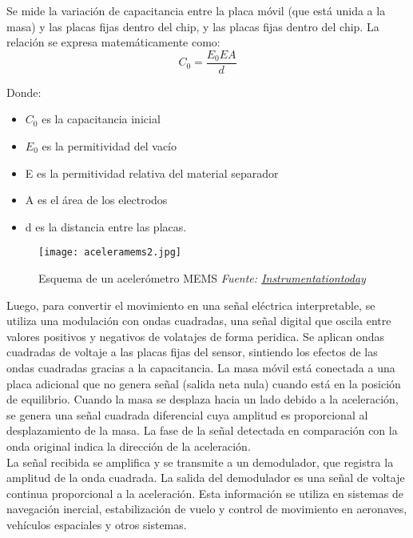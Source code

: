 Se mide la variación de capacitancia entre la placa móvil (que está unida a la masa) y las placas fijas dentro del chip, y las placas fijas dentro del chip. La relación se expresa matemáticamente como:
\begin{equation}
C_{0} = \frac{E_{0} E A}{d}
\end{equation}

Donde:
\begin{itemize}
\item \(C_{0}\) es la capacitancia inicial
\item \(E_{0}\) es la permitividad del vacío
\item E es la permitividad relativa del material separador
\item A es el área de los electrodos 
\item d es la distancia entre las placas.
\end{itemize}


\begin{figure}[H]
    \centering
    \texttt{[image: aceleramems2.jpg]}
    \caption{\centering Esquema de un acelerómetro MEMS\textit{ Fuente: \href{https://www.instrumentationtoday.com/basic-instrumentation/page/3/}{Instrumentationtoday}}}
    \label{fig:mems2}
\end{figure}

Luego, para convertir el movimiento en una señal eléctrica interpretable, se utiliza una modulación con ondas cuadradas, una señal digital que oscila entre valores positivos y negativos de volatajes de forma peridica. Se aplican ondas cuadradas de voltaje a las placas fijas del sensor, sintiendo los efectos de las ondas cuadradas gracias a la capacitancia. La masa móvil está conectada a una placa adicional que no genera señal (salida neta nula) cuando está en la posición de equilibrio. Cuando la masa se desplaza hacia un lado debido a la aceleración, se genera una señal cuadrada diferencial cuya amplitud es proporcional al desplazamiento de la masa. La fase de la señal detectada en comparación con la onda original indica la dirección de la aceleración.\\

La señal recibida se amplifica y se transmite a un demodulador, que registra la amplitud de la onda cuadrada. La salida del demodulador es una señal de voltaje continua proporcional a la aceleración. Esta información se utiliza en sistemas de navegación inercial, estabilización de vuelo y control de movimiento en aeronaves, vehículos espaciales y otros sistemas.\\

